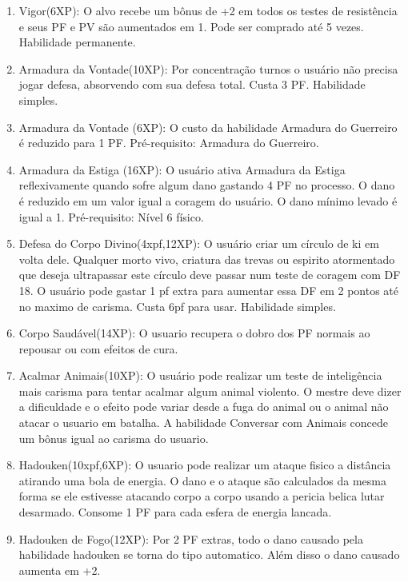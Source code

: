 \begin{enumerate}
	\item Vigor(6XP): O alvo recebe um bônus de +2 em todos os testes de resistência e seus PF e PV são aumentados em 1. Pode ser comprado até 5 vezes. Habilidade permanente.

	\item Armadura da Vontade(10XP): Por concentração turnos o usuário não precisa jogar defesa, absorvendo com sua defesa total. Custa 3 PF. Habilidade simples.

	\item Armadura da Vontade (6XP): O custo da habilidade Armadura do Guerreiro é reduzido para 1 PF. Pré-requisito: Armadura do Guerreiro. 

	\item Armadura da Estiga (16XP): O usuário ativa Armadura da Estiga reflexivamente quando sofre algum dano gastando 4 PF no processo. O dano é reduzido em um valor igual a coragem do usuário. O dano mínimo levado é igual a 1. Pré-requisito: Nível 6 físico. 

	\item Defesa do Corpo Divino(4xpf,12XP): O usuário criar um círculo de ki em volta dele. Qualquer morto vivo, criatura das trevas ou espirito atormentado que deseja ultrapassar este círculo deve passar num teste de coragem com DF 18. O usuário pode gastar 1 pf extra para aumentar essa DF em 2 pontos até no maximo de carisma. Custa 6pf para usar. Habilidade simples.

\item Corpo Saudável(14XP): O usuario recupera o dobro dos PF normais ao repousar ou com efeitos de cura.
	
	\item Acalmar Animais(10XP): O usuário pode realizar um teste de inteligência mais carisma para tentar acalmar algum animal violento. O mestre deve dizer a dificuldade e o efeito pode variar desde a fuga do animal ou o animal não atacar o usuario em batalha. A habilidade Conversar com Animais concede um bônus igual ao carisma do usuario.

  	\item Hadouken(10xpf,6XP): O usuario pode realizar um ataque fisico a distância atirando uma bola de energia. O dano e o ataque são calculados da mesma forma se ele estivesse atacando corpo a corpo usando a pericia belica lutar desarmado. Consome 1 PF para cada esfera de energia lancada. 
  
\item Hadouken de Fogo(12XP): Por 2 PF extras, todo o dano causado pela habilidade hadouken se torna do tipo automatico. Além disso o dano causado aumenta em +2. 


\end{enumerate}
